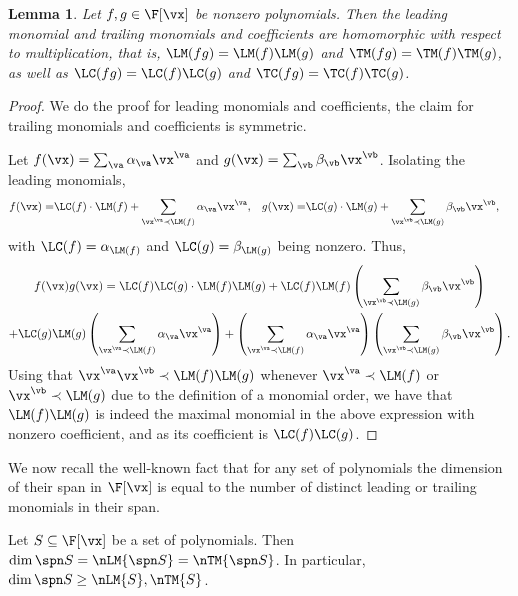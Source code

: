\documentclass[11pt]{article}
\numberwithin{equation}{section}
\newtheorem{lemma}[theorem]{Lemma}
\theoremstyle{definition}
\theoremstyle{plain}
\begin{document}
\begin{lemma}\label{res:hom_LM-TM_mult}
        Let $f,g\in\F[\vx]$ be nonzero polynomials. Then the leading monomial and trailing monomials and coefficients are homomorphic with respect to multiplication, that is, $\LM(fg)=\LM(f)\LM(g)$ and $\TM(fg)=\TM(f)\TM(g)$, as well as $\LC(fg)=\LC(f)\LC(g)$ and $\TC(fg)=\TC(f)\TC(g)$.
\end{lemma}
\begin{proof}
        We do the proof for leading monomials and coefficients, the claim for trailing monomials and coefficients is symmetric.

        Let $f(\vx)=\sum_\va \alpha_\va \vx^\va$ and $g(\vx)=\sum_\vb \beta_\vb \vx^\vb$.  Isolating the leading monomials,
        \begin{align*}
                f(\vx)=&\LC(f)\cdot \LM(f)+\sum_{\vx^\va\prec\LM(f)} \alpha_\va \vx^\va,&
                g(\vx)=&\LC(g)\cdot \LM(g)+\sum_{\vx^\vb\prec\LM(g)} \beta_\vb \vx^\vb,
        \end{align*}
        with $\LC(f)=\alpha_{\LM(f)}$ and $\LC(g)=\beta_{\LM(g)}$ being nonzero.  Thus,
        \begin{multline*}
                f(\vx)g(\vx)=\LC(f)\LC(g) \cdot \LM(f)\LM(g)
                +\LC(f)\LM(f)\left(\sum_{\vx^\vb\prec\LM(g)} \beta_\vb \vx^\vb\right)\\
                +\LC(g)\LM(g)\left(\sum_{\vx^\va\prec\LM(f)} \alpha_\va \vx^\va\right)
                +\left(\sum_{\vx^\va\prec\LM(f)} \alpha_\va \vx^\va\right)\left(\sum_{\vx^\vb\prec\LM(g)} \beta_\vb \vx^\vb\right).
        \end{multline*}
        Using that $\vx^\va\vx^\vb\prec \LM(f) \LM(g)$ whenever $\vx^\va\prec\LM(f)$ or $\vx^\vb\prec\LM(g)$ due to the definition of a monomial order, we have that $\LM(f)\LM(g)$ is indeed the maximal monomial in the above expression with nonzero coefficient, and as its coefficient is $\LC(f)\LC(g)$.
\end{proof}

We now recall the well-known fact that for any set of polynomials the dimension of their span in $\F[\vx]$ is equal to the number of distinct leading or trailing monomials in their span.

\begin{lemmawp}\label{res:dim-eq-num-TM-spn}
        Let $S\subseteq\F[\vx]$ be a set of polynomials.  Then $\dim \spn S=\nLM{\spn S}=\nTM{\spn S}$.  In particular, $\dim \spn S\ge \nLM{S},\nTM{S}$.
\end{lemmawp}
\end{document}
